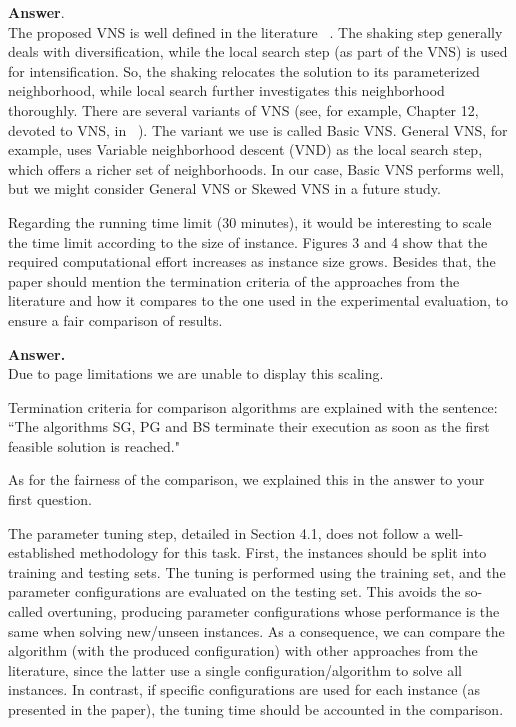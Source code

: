 \documentclass [11pt]{scrartcl}
\begin{document}
	\textbf{Answer}. \\
	The proposed VNS is well defined in the literature ~\cite{mladenovic1997variable}. 
	The shaking step generally deals with diversification, while the local search step (as part of the VNS) is used for intensification. So, the shaking relocates the solution to its parameterized neighborhood, while local search further investigates this neighborhood thoroughly. 
	There are several variants of VNS (see, for example, Chapter 12, devoted to VNS, in ~\cite{burke2014search}). The variant we use is called Basic VNS. General VNS, for example, uses Variable neighborhood descent (VND) as the local search step, which offers a richer set of neighborhoods. 
	In our case, Basic VNS performs well, but we might consider General VNS or Skewed VNS in a future study. 

\begin{leftbar}
Regarding the running time limit (30 minutes), it would be interesting to scale the time limit according to the size of instance. Figures 3 and 4 show that the required computational effort increases as instance size grows. Besides that, the paper should mention the termination criteria of the approaches from the literature and how it compares to the one used in the experimental evaluation, to ensure a fair comparison of results.	
\end{leftbar}

\textbf{Answer.}\\ 
Due to page limitations we are unable to display this scaling. 

Termination criteria for comparison algorithms are explained with the sentence:
``The algorithms SG, PG and BS terminate their execution as soon as the first feasible solution is reached."

As for the fairness of the comparison, we explained this in the answer to your first question.

\begin{leftbar}
The parameter tuning step, detailed in Section 4.1, does not follow a well-established methodology for this task. First, the instances should be split into training and testing sets. The tuning is performed using the training set, and the parameter configurations are evaluated on the testing set. This avoids the so-called overtuning, producing parameter configurations whose performance is the same when solving new/unseen instances. As a consequence, we can compare the algorithm (with the produced configuration) with other approaches from the literature, since the latter use a single configuration/algorithm to solve all instances. In contrast, if specific configurations are used for each instance (as presented in the paper), the tuning time should be accounted in the comparison.
	
\end{leftbar}
\end{document}
